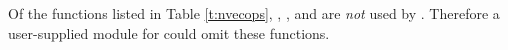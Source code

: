Of the functions listed in Table \ref{t:nvecops}, , 
, and  are {\em not} used by
{\idas}. Therefore a user-supplied {\nvector} module for {\idas} could
omit these functions. 













